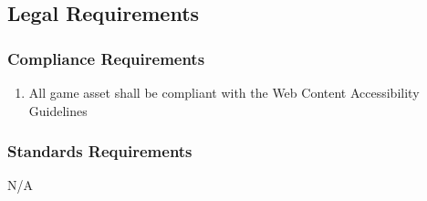 \documentclass[12pt, titlepage]{article}
\begin{document}

\subsection{Legal Requirements}
\label{sub:legal_requirements}

\subsubsection{Compliance Requirements}
\label{ssub:compliance_requirements}
\begin{enumerate}[{LR}1. ]
        \item All game asset shall be compliant with the Web Content Accessibility Guidelines
\end{enumerate}

\subsubsection{Standards Requirements}
\label{ssub:standards_requirements}
N/A


\end{document}
